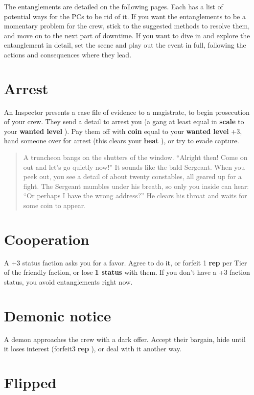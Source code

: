 \documentclass[11pt,oneside]{book}
\newcommand{\gameterm}[1]{\textbf{#1}}
\begin{document}
The entanglements are detailed on the following pages. Each has a list of potential ways for the PCs to be rid of it. If you want the entanglements to be a momentary problem for the crew, stick to the suggested methods to resolve them, and move on to the next part of downtime. If you want to dive in and explore the entanglement in detail, set the scene and play out the event in full, following the actions and consequences where they lead.

\section{Arrest}

An Inspector presents a case file of evidence to a magistrate, to begin prosecution of your crew. They send a detail to arrest you (a gang at least equal in \textbf{scale} to your \gameterm{wanted level} ). Pay them off with \gameterm{coin}  equal to your \gameterm{wanted level}  +3, hand someone over for arrest (this clears your \gameterm{heat} ), or try to evade capture.

\begin{quote}
	A truncheon bangs on the shutters of the window. “Alright then! Come on out and let’s go quietly now!” It sounds like the bald Sergeant. When you peek out, you see a detail of about twenty constables, all geared up for a fight. The Sergeant mumbles under his breath, so only you inside can hear: “Or perhaps I have the wrong address?” He clears his throat and waits for some coin to appear.
\end{quote} 

\section{Cooperation}

A +3 status faction asks you for a favor. Agree to do it, or forfeit 1 \gameterm{rep}  per Tier of the friendly faction, or lose \textbf{1 status} with them. If you don’t have a +3 faction status, you avoid entanglements right now.

\section{Demonic notice}

A demon approaches the crew with a dark offer. Accept their bargain, hide until it loses interest (forfeit3 \gameterm{rep} ), or deal with it another way.

\section{Flipped}
\end{document}
